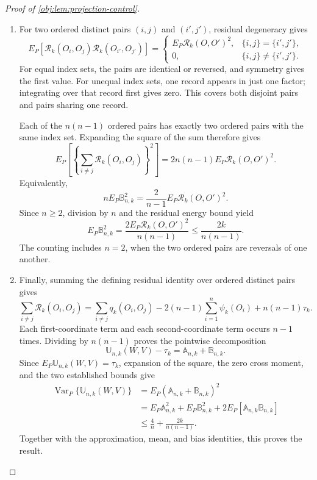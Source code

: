 \begin{proof}[Proof of \cref{obj:lem:projection-control}]
\begin{enumerate}
\item For two ordered distinct pairs \((i,j)\) and \((i',j')\), residual degeneracy gives
\[
E_P[
 \mathcal R_k(O_i,O_j)\mathcal R_k(O_{i'},O_{j'})
]
=
\begin{cases}
E_P\mathcal R_k(O,O')^2,
 &\{i,j\}=\{i',j'\},\\
0,&\{i,j\}\ne\{i',j'\}.
\end{cases}
\]
For equal index sets, the pairs are identical or reversed, and symmetry gives the first value. For unequal index sets, one record appears in just one factor; integrating over that record first gives zero. This covers both disjoint pairs and pairs sharing one record.

Each of the \(n(n-1)\) ordered pairs has exactly two ordered pairs with the same index set. Expanding the square of the sum therefore gives
\[
E_P\left[
 \left\{\sum_{i\ne j}\mathcal R_k(O_i,O_j)\right\}^2
\right]
=2n(n-1)E_P\mathcal R_k(O,O')^2.
\]
Equivalently,
\[
nE_P\mathbb B_{n,k}^2
=\frac2{n-1}E_P\mathcal R_k(O,O')^2.
\]
Since \(n\ge2\), division by \(n\) and the residual energy bound yield
\[
E_P\mathbb B_{n,k}^2
=\frac{2E_P\mathcal R_k(O,O')^2}{n(n-1)}
\le\frac{2k}{n(n-1)}.
\]
The counting includes \(n=2\), when the two ordered pairs are reversals of one another.

\item Finally, summing the defining residual identity over ordered distinct pairs gives
\[
\sum_{i\ne j}\mathcal R_k(O_i,O_j)
=\sum_{i\ne j}q_k(O_i,O_j)
 -2(n-1)\sum_{i=1}^n\psi_k(O_i)+n(n-1)\tau_k.
\]
Each first-coordinate term and each second-coordinate term occurs \(n-1\) times. Dividing by \(n(n-1)\) proves the pointwise decomposition
\[
\mathbb U_{n,k}(W,V)-\tau_k
=\mathbb A_{n,k}+\mathbb B_{n,k}.
\]
Since \(E_P\mathbb U_{n,k}(W,V)=\tau_k\), expansion of the square, the zero cross moment, and the two established bounds give
\[
\begin{aligned}
\operatorname{Var}_P\{\mathbb U_{n,k}(W,V)\}
&=E_P(\mathbb A_{n,k}+\mathbb B_{n,k})^2\\
&=E_P\mathbb A_{n,k}^2+E_P\mathbb B_{n,k}^2
  +2E_P[\mathbb A_{n,k}\mathbb B_{n,k}]\\
&\le\frac4n+\frac{2k}{n(n-1)}.
\end{aligned}
\]
Together with the approximation, mean, and bias identities, this proves the result.
\end{enumerate}
\end{proof}
